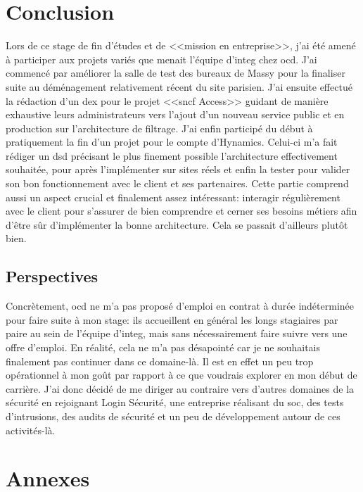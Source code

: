 \documentclass[12pt, oneside, a4paper, titlepage]{report}
\begin{document}
\chapter{Conclusion}%
\label{cha:conclu}

Lors de ce stage de fin d'études et de <<mission en entreprise>>, j'ai été amené
à participer aux projets variés que menait l'équipe d'\gls{integ} chez
\acrlong{ocd}. J'ai commencé par améliorer la salle de test des bureaux de Massy
pour la finaliser suite au déménagement relativement récent du site parisien.
J'ai ensuite effectué la rédaction d'un \acrfull{dex} pour le projet
<<\gls{sncf} Access>> guidant de manière exhaustive leurs administrateurs vers
l'ajout d'un nouveau service public et en production sur l'architecture de
filtrage. J'ai enfin participé du début à pratiquement la fin d'un projet pour
le compte d'Hynamics. Celui-ci m'a fait rédiger un \acrfull{dsd} précisant le
plus finement possible l'architecture effectivement souhaitée, pour après
l'implémenter sur sites réels et enfin la tester pour valider son bon
fonctionnement avec le client et ses partenaires. Cette partie comprend aussi un
aspect crucial et finalement assez intéressant: interagir régulièrement avec le
client pour s'assurer de bien comprendre et cerner ses besoins métiers afin
d'être sûr d'implémenter la bonne architecture. Cela se passait d'ailleurs
plutôt bien.

\section{Perspectives}%
\label{sec:conclu::persp}

Concrètement, \acrlong{ocd} ne m'a pas proposé d'emploi en contrat à durée
indéterminée pour faire suite à mon stage: ils accueillent en général les longs
stagiaires par paire au sein de l'équipe d'\gls{integ}, mais sans nécessairement
faire suivre vers une offre d'emploi. En réalité, cela ne m'a pas désapointé car
je ne souhaitais finalement pas continuer dans ce domaine-là. Il est en effet un
peu trop opérationnel à mon goût par rapport à ce que voudrais explorer en mon
début de carrière. J'ai donc décidé de me diriger au contraire vers d'autres
domaines de la sécurité en rejoignant Login Sécurité, une entreprise réalisant
du \gls{soc}, des tests d'intrusions, des audits de sécurité et un peu de
développement autour de ces activités-là.


\chapter{Annexes}%
\label{cha:annexes}
\end{document}
